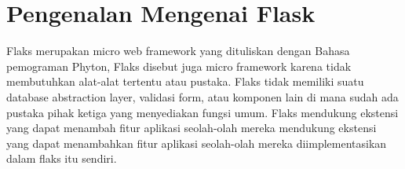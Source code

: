 
\section {Pengenalan Mengenai Flask}
Flaks merupakan micro web framework yang dituliskan dengan Bahasa pemograman Phyton, Flaks disebut juga micro framework karena tidak 
membutuhkan alat-alat tertentu atau pustaka. Flaks tidak memiliki suatu database abstraction layer, validasi form, atau komponen lain 
di mana sudah ada pustaka pihak ketiga yang menyediakan fungsi umum. Flaks mendukung ekstensi yang dapat menambah fitur aplikasi 
seolah-olah mereka mendukung ekstensi yang dapat menambahkan fitur aplikasi seolah-olah mereka diimplementasikan dalam flaks itu 
sendiri.

